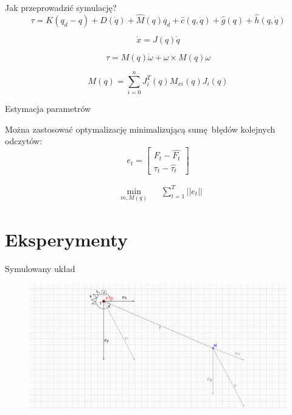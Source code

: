 \documentclass{beamer}
\begin{document}
\begin{frame}{Jak przeprowadzić symulację?}
\begin{equation}
\tau = K(q_d-q) + D(\dot{q}) + \hat{M}(q)\ddot{q_d} + \hat{c}(q, \dot{q}) + \hat{g}(q) + \hat{h}(q, \dot{q})
\end{equation}

\begin{equation}
	\dot{x} = J(q)\dot{q}
\end{equation}


\begin{equation}
\tau = M(q)\dot{\omega} + \omega \times M(q)\omega
\end{equation}

\begin{equation}
M(q) = \sum_{i=0}^{n}J_i^T(q)M_{xi}(q)J_i(q)
\end{equation}
\end{frame}


\begin{frame}{Estymacja parametrów}

Można zastosować optymalizację minimalizującą sumę błędów kolejnych odczytów:
\begin{equation}
e_t = \begin{bmatrix}
F_t - \hat{F_t}\\
\tau_t - \hat{\tau_t} 
\end{bmatrix}
\end{equation}

\begin{equation}
\begin{aligned}
& \underset{m, M(q)}{\text{min}}
& & \sum_{t = 1}^{T} || e_t ||
\end{aligned}
\end{equation}

\end{frame}

\section{Eksperymenty}
\begin{frame}{Symulowany układ}
\begin{figure}[h]
	\centering
	\includegraphics[scale=1.30]{2d}
\end{figure}


\end{frame}
\end{document}
